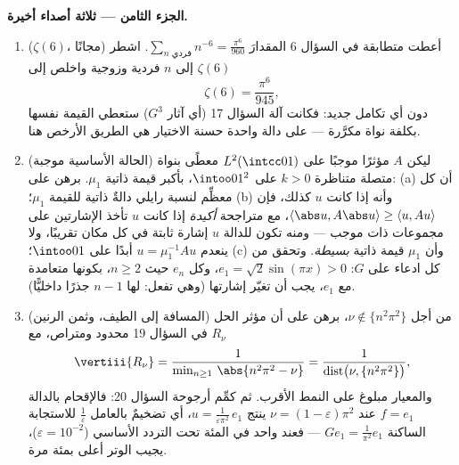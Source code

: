 \begin{problem}
\medskip
\noindent\textbf{الجزء الثامن --- ثلاثة أصداء أخيرة.}
\begin{enumerate}[resume]
  \item ($\zeta(6)$، مجانًا) أعطت متطابقة  في السؤال 6
        المقدارَ $\sum_{n\text{ فردي}}n^{-6} =
        \frac{\pi^6}{960}$. اشطر $\zeta(6)$ إلى $n$ فردية وزوجية
        واخلص إلى
        \[
        \zeta(6) = \frac{\pi^6}{945},
        \]
        دون أي تكامل جديد: فكانت آلة السؤال 17 (أي آثار $G^3$)
        ستعطي القيمة نفسها بكلفة نواة مكرَّرة ---  على
        دالة واحدة حسنة الاختيار هي الطريق الأرخص هنا.
  \item (الحالة الأساسية موجبة) ليكن $A$ مؤثرًا   موجبًا على $L^2(\intcc01)$ معطًى بنواة متصلة
        متناظرة $k > 0$ على $\intoo01^2$، بأكبر قيمة ذاتية
        $\mu_1$. برهن على: (a) أن كل معظِّم لنسبة رايلي دالةٌ
        ذاتية للقيمة $\mu_1$؛ (b) وأنه إذا كانت $u$ كذلك، فإن
        $\langle\abs u, A\abs u\rangle \geq \langle u,
        Au\rangle$، مع متراجحة \emph{أكيدة} إذا كانت $u$ تأخذ
        الإشارتين على مجموعات ذات  موجب --- ومنه تكون
        للدالة $u$ إشارة ثابتة في كل مكان تقريبًا، ولا ينعدم
        $u = \mu_1^{-1}Au$ أبدًا على $\intoo01$؛ (c) وأن $\mu_1$ قيمة
        ذاتية \emph{بسيطة}. وتحقق من كل ادعاء على $G$: $e_1 = \sqrt2\sin(\pi x) > 0$،
        وكل $e_n$ حيث $n
        \geq 2$، بكونها متعامدة مع $e_1$، يجب أن
        تغيّر إشارتها (وهي تفعل: لها $n - 1$ جذرًا داخليًّا).
  \item (المسافة إلى الطيف، وثمن الرنين) من أجل $\nu \notin \{n^2\pi^2\}$، برهن
        على أن مؤثر الحل $R_\nu$ في السؤال 19 محدود  ومتراص، مع
        \[
        \vertiii{R_\nu} =
        \frac1{\min_{n\geq1}\,\abs{n^2\pi^2 - \nu}}
        = \frac1{\operatorname{dist}\bigl(\nu,
        \{n^2\pi^2\}\bigr)},
        \]
        والمعيار مبلوغ على النمط الأقرب. ثم كمِّم أرجوحة السؤال
        20: فالإقحام بالدالة $f = e_1$ عند $\nu = (1 - \varepsilon)\pi^2$ ينتج $u =
        \frac{1}{\varepsilon\pi^2}\,e_1$،
        أي تضخيمٌ بالعامل $\frac1\varepsilon$ للاستجابة الساكنة $Ge_1 =
        \frac1{\pi^2}e_1$ ---
        فعند واحد في المئة تحت التردد الأساسي ($\varepsilon = 10^{-2}$)، يجيب
        الوتر أعلى بمئة مرة.
\end{enumerate}
\end{problem}
